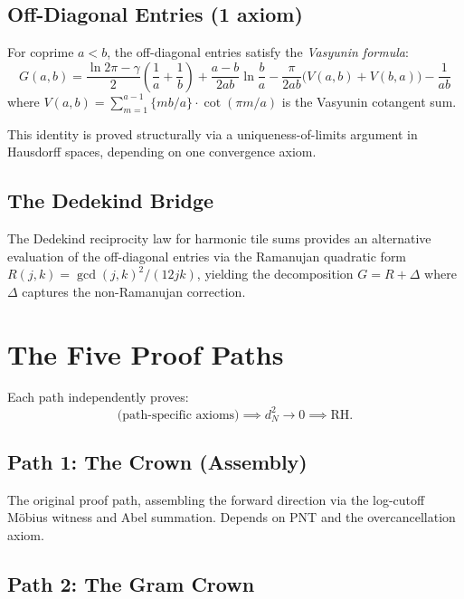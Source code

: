\documentclass[11pt,a4paper]{article}
\theoremstyle{definition}
\newcommand{\RH}{\mathrm{RH}}
\newcommand{\fract}[1]{\{#1\}}
\begin{document}
\subsection{Off-Diagonal Entries (1 axiom)}

For coprime $a < b$, the off-diagonal entries satisfy
the \emph{Vasyunin formula}:
\[
  G(a,b) = \frac{\ln 2\pi - \gamma}{2}\left(\frac{1}{a} + \frac{1}{b}\right)
  + \frac{a-b}{2ab}\ln\frac{b}{a}
  - \frac{\pi}{2ab}\bigl(V(a,b) + V(b,a)\bigr)
  - \frac{1}{ab}
\]
where $V(a,b) = \sum_{m=1}^{a-1} \fract{mb/a} \cdot \cot(\pi m/a)$
is the Vasyunin cotangent sum.

This identity is proved structurally via a uniqueness-of-limits argument
in Hausdorff spaces, depending on one convergence axiom.

\subsection{The Dedekind Bridge}
\label{sec:dedekind}

The Dedekind reciprocity law for harmonic tile sums provides an
alternative evaluation of the off-diagonal entries via the Ramanujan
quadratic form $R(j,k) = \gcd(j,k)^2/(12jk)$, yielding the
decomposition $G = R + \Delta$ where $\Delta$ captures the
non-Ramanujan correction.

\section{The Five Proof Paths}
\label{sec:paths}

Each path independently proves:
\[
  \text{(path-specific axioms)} \implies d_N^2 \to 0 \implies \RH.
\]


\subsection{Path 1: The Crown (Assembly)}

The original proof path, assembling the forward direction via the
log-cutoff M\"obius witness and Abel summation. Depends on PNT and
the overcancellation axiom.

\subsection{Path 2: The Gram Crown}
\end{document}
